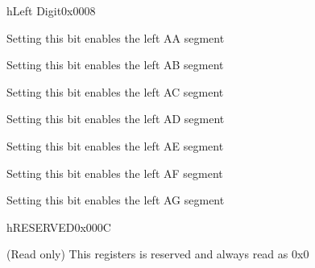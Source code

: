 \documentclass{report}
\begin{document}
\begin{register}{h}{Left Digit}{0x0008}%
\label{LD}%
%
%
%
%
%
%
%
%
\regnewline%
\begin{regdesc}\begin{reglist}
\item [AA]Setting this bit enables the left AA segment
\item [AB]Setting this bit enables the left AB segment
\item [AC]Setting this bit enables the left AC segment
\item [AD]Setting this bit enables the left AD segment
\item [AE]Setting this bit enables the left AE segment
\item [AF]Setting this bit enables the left AF segment
\item [AG]Setting this bit enables the left AG segment
\end{reglist}\end{regdesc}\end{register}


\begin{register}{h}{RESERVED}{0x000C}%
\label{RES}%
%
\regnewline%
\begin{regdesc}\begin{reglist}
\item [RESERVED] (Read only) This registers is reserved and always read as 0x0
\end{reglist}\end{regdesc}\end{register}
\end{document}
